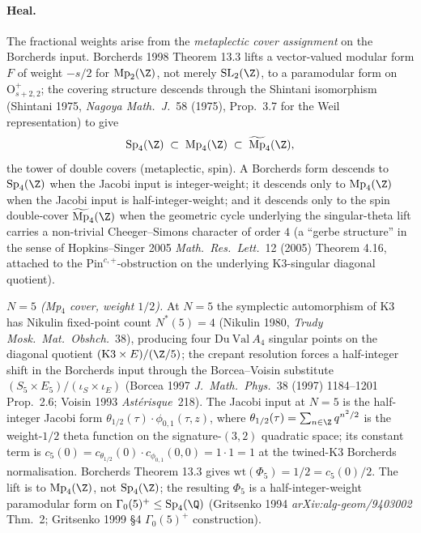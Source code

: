 \paragraph{Heal.} The fractional weights arise from the
\emph{metaplectic cover assignment} on the Borcherds input. Borcherds
1998 Theorem 13.3 lifts a vector-valued modular form $F$ of weight
$-s/2$ for $\mathrm{Mp}_2(\Z)$, not merely $\mathrm{SL}_2(\Z)$, to
a paramodular form on $\mathrm{O}^+_{s + 2, 2}$; the covering
structure descends through the Shintani isomorphism (Shintani
1975, \emph{Nagoya Math.\ J.}~58 (1975), Prop.\ 3.7 for the Weil
representation) to give
\[
  \mathrm{Sp}_4(\Z) \;\subset\;
    \mathrm{Mp}_4(\Z) \;\subset\;
    \widetilde{\mathrm{Mp}}_4(\Z),
\]
the tower of double covers (metaplectic, spin). A Borcherds form
descends to $\mathrm{Sp}_4(\Z)$ when the Jacobi input is
integer-weight; it descends only to $\mathrm{Mp}_4(\Z)$ when the
Jacobi input is half-integer-weight; and it descends only to the
spin double-cover $\widetilde{\mathrm{Mp}}_4(\Z)$ when the
geometric cycle underlying the singular-theta lift carries a
non-trivial Cheeger--Simons character of order $4$ (a ``gerbe
structure'' in the sense of Hopkins--Singer 2005 \emph{Math.\ Res.\
Lett.}~12 (2005) Theorem 4.16, attached to the
$\mathrm{Pin}^{c, +}$-obstruction on the underlying K3-singular
diagonal quotient).

\emph{$N = 5$ (Mp$_4$ cover, weight $1/2$).} At $N = 5$ the
symplectic automorphism of K3 has Nikulin fixed-point count
$N^*(5) = 4$ (Nikulin 1980, \emph{Trudy Mosk.\ Mat.\ Obshch.}~38),
producing four $\mathrm{Du\ Val}\ A_4$ singular points on the
diagonal quotient $(\mathrm{K3} \times E)/(\Z/5)$; the crepant
resolution forces a half-integer shift in the Borcherds input
through the Borcea--Voisin substitute
$(S_5 \times E_5)/(\iota_S \times \iota_E)$ (Borcea 1997
\emph{J.\ Math.\ Phys.}~38 (1997) 1184--1201 Prop.\ 2.6; Voisin
1993 \emph{Astérisque}~218). The Jacobi input at $N = 5$ is the
half-integer Jacobi form
$\theta_{1/2}(\tau) \cdot \phi_{0, 1}(\tau, z)$, where
$\theta_{1/2}(\tau) = \sum_{n \in \Z} q^{n^2/2}$ is the
weight-$1/2$ theta function on the signature-$(3, 2)$ quadratic
space; its constant term is
$c_5(0) = c_{\theta_{1/2}}(0) \cdot c_{\phi_{0, 1}}(0, 0) =
1 \cdot 1 = 1$ at the twined-K3 Borcherds normalisation. Borcherds
Theorem 13.3 gives $\mathrm{wt}(\Phi_5) = 1/2 = c_5(0)/2$. The
lift is to $\mathrm{Mp}_4(\Z)$, not $\mathrm{Sp}_4(\Z)$; the
resulting $\Phi_5$ is a half-integer-weight paramodular form on
$\Gamma_0(5)^+ \leq \mathrm{Sp}_4(\Q)$ (Gritsenko 1994
\emph{arXiv:alg-geom/9403002} Thm.~2; Gritsenko 1999 \S 4
$\Gamma_0(5)^+$ construction).


